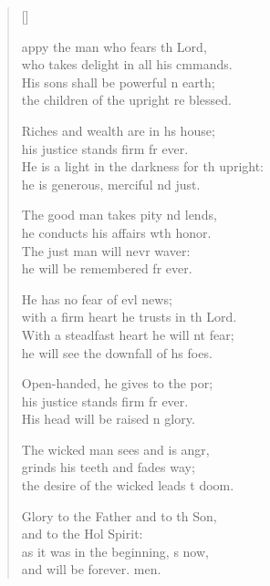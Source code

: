 \settowidth{\versewidth}{He is a light in the darkness for the upright: *}
\begin{verse}[\versewidth]
  \begin{patverse}
appy the man who fears th Lord,\Med\\
who takes delight in all his cmmands.\\
His sons shall be powerful n earth;\Med\\
the children of the upright re blessed.

Riches and wealth are in hs house;\Med\\
his justice stands firm fr ever.\\
He is a light in the darkness for th upright:\Med\\
he is generous, merciful nd just.

The good man takes pity nd lends,\Med\\
he conducts his affairs wth honor.\\
The just man will nevr waver:\Med\\
he will be remembered fr ever.

He has no fear of evl news;\Med\\
with a firm heart he trusts in th Lord.\\
With a steadfast heart he will nt fear;\Med\\
he will see the downfall of hs foes.

Open-handed, he gives to the por;\Flex\\
his justice stands firm fr ever.\Med\\
His head will be raised n glory.

The wicked man sees and is angr,\Flex\\
grinds his teeth and fades way;\Med\\
the desire of the wicked leads t doom.

Glory to the Father and to th Son,\Med\\
and to the Hol Spirit:\\
as it was in the beginning, s now,\Med\\
and will be forever. men. 
  \end{patverse}
\end{verse}
